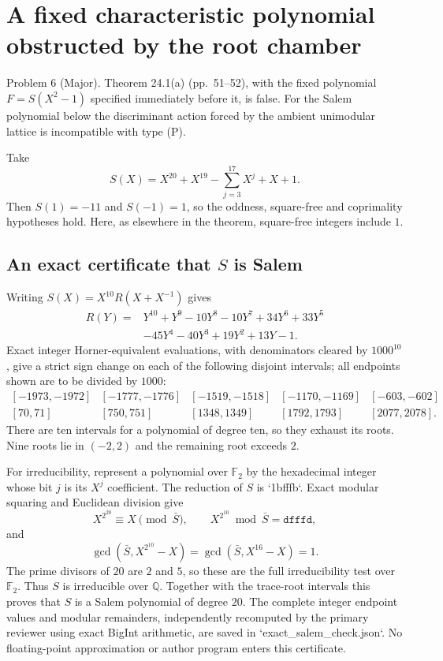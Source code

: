 \documentclass[10pt]{article}
\begin{document}
\section*{A fixed characteristic polynomial obstructed by the root chamber}
Problem 6 (Major).  Theorem 24.1(a) (pp. 51–52), with the fixed polynomial \(F=S(X^2-1)\) specified immediately before it, is false. For the Salem polynomial below the discriminant action forced by the ambient unimodular lattice is incompatible with type (P).\par
Take \[S(X)=X^{20}+X^{19}-\sum_{j=3}^{17}X^j+X+1.\] Then \(S(1)=-11\) and \(S(-1)=1\), so the oddness, square-free and coprimality hypotheses hold. Here, as elsewhere in the theorem, square-free integers include \(1\).\par
\subsection*{An exact certificate that \(S\) is Salem}
Writing \(S(X)=X^{10}R(X+X^{-1})\) gives \[\begin{split}
R(Y)={}&Y^{10}+Y^9-10Y^8-10Y^7+34Y^6+33Y^5\\
 &-45Y^4-40Y^3+19Y^2+13Y-1.
\end{split}\] Exact integer Horner-equivalent evaluations, with denominators cleared by \(1000^{10}\), give a strict sign change on each of the following disjoint intervals; all endpoints shown are to be divided by \(1000\): \[\begin{array}{ccccc}
[-1973,-1972]&[-1777,-1776]&[-1519,-1518]&[-1170,-1169]&[-603,-602]\\
{}[70,71]&[750,751]&[1348,1349]&[1792,1793]&[2077,2078].
\end{array}\] There are ten intervals for a polynomial of degree ten, so they exhaust its roots. Nine roots lie in \((-2,2)\) and the remaining root exceeds \(2\).\par
For irreducibility, represent a polynomial over \(\mathbb F_2\) by the hexadecimal integer whose bit \(j\) is its \(X^j\) coefficient. The reduction of \(S\) is `1bfffb`. Exact modular squaring and Euclidean division give \[X^{2^{20}}\equiv X\pmod{\bar S},\qquad
 X^{2^{10}}\bmod\bar S=\mathtt{dfffd},\] and \[\gcd(\bar S,X^{2^{10}}-X)=
 \gcd(\bar S,X^{16}-X)=1.\] The prime divisors of \(20\) are \(2\) and \(5\), so these are the full irreducibility test over \(\mathbb F_2\). Thus \(S\) is irreducible over \(\mathbb Q\). Together with the trace-root intervals this proves that \(S\) is a Salem polynomial of degree \(20\). The complete integer endpoint values and modular remainders, independently recomputed by the primary reviewer using exact BigInt arithmetic, are saved in `exact\_salem\_check.json`. No floating-point approximation or author program enters this certificate.\par
\end{document}
